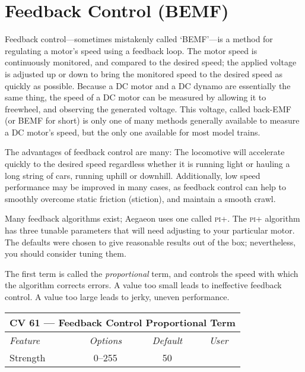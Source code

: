 \documentclass[12pt,letterpaper,draft]{memoir} %
\begin{document}
\section{Feedback Control (BEMF)}
\label{BEMF}

Feedback control---sometimes mistakenly called `BEMF'---is a method for regulating a motor's speed using a feedback loop. The motor speed is continuously monitored, and compared to the desired speed; the applied voltage is adjusted up or down to bring the monitored speed to the desired speed as quickly as possible. Because a DC motor and a DC dynamo are essentially the same thing, the speed of a DC motor can be measured by allowing it to freewheel, and observing the generated voltage. This voltage, called back-EMF (or BEMF for short) is only one of many methods generally available to measure a DC motor's speed, but the only one available for most model trains.

The advantages of feedback control are many: The locomotive will accelerate quickly to the desired speed regardless whether it is running light or hauling a long string of cars, running uphill or downhill. Additionally, low speed performance may be improved in many cases, as feedback control can help to smoothly overcome static friction (stiction), and maintain a smooth crawl.

Many feedback algorithms exist; Aegaeon uses one called \textsc{pi+}. The \textsc{pi+} algorithm has three tunable parameters that will need adjusting to your particular motor. The defaults were chosen to give reasonable results out of the box; nevertheless, you should consider tuning them.

The first term is called the \textit{proportional} term, and controls the speed with which the algorithm corrects errors. A value too small leads to ineffective feedback control. A value too large leads to jerky, uneven performance.

\label{CV61}
\begin{center}
\begin{tabular}{|l|c|c|c|}
\hline
\multicolumn{4}{|c|}{\textbf{CV 61 --- Feedback Control Proportional Term}} \\ \hline \hline
\textit{Feature} & \textit{Options} & \textit{Default} & \textit{User} \\ \hline
Strength & 0--255 & 50 &\\ \hline
\end{tabular}
\end{center}
\end{document}
